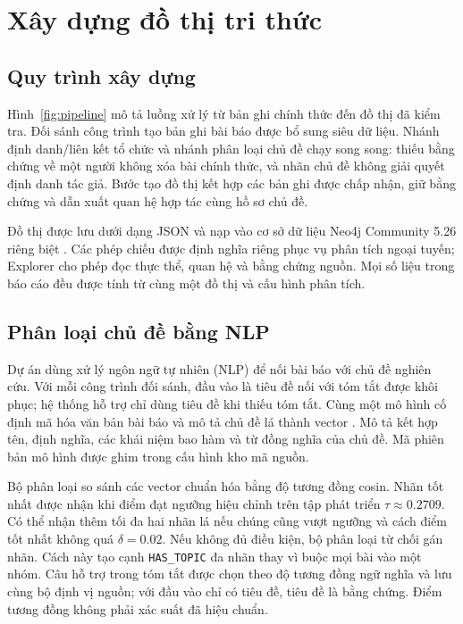 \chapter{Xây dựng đồ thị tri thức}
\label{ch:graph}
\section{Quy trình xây dựng}
Hình~\ref{fig:pipeline} mô tả luồng xử lý từ bản ghi chính thức đến đồ thị đã
kiểm tra. Đối sánh công trình tạo bản ghi bài báo được bổ sung siêu dữ liệu.
Nhánh định danh/liên kết tổ chức và nhánh phân loại chủ đề chạy song song:
thiếu bằng chứng về một người không xóa bài chính thức, và nhãn chủ đề không
giải quyết định danh tác giả. Bước tạo đồ thị kết hợp các bản ghi được chấp
nhận, giữ bằng chứng và dẫn xuất quan hệ hợp tác cùng hồ sơ chủ đề.



Đồ thị được lưu dưới dạng JSON và nạp vào cơ sở dữ liệu
Neo4j Community 5.26 riêng biệt \citep{neo4jDocs}. Các phép chiếu
được định nghĩa riêng phục vụ phân tích ngoại tuyến; Explorer cho phép đọc
thực thể, quan hệ và bằng chứng nguồn. Mọi số liệu trong báo cáo đều được tính
từ cùng một đồ thị và cấu hình phân tích.

\section{Phân loại chủ đề bằng NLP}
Dự án dùng xử lý ngôn ngữ tự nhiên (NLP) để nối bài báo với chủ đề nghiên cứu.
Với mỗi công trình đối sánh, đầu vào là tiêu đề nối với tóm tắt được khôi phục;
hệ thống hỗ trợ chỉ dùng tiêu đề khi thiếu tóm tắt. Cùng một mô hình cố định
 mã hóa văn bản bài báo và mô tả
chủ đề lá thành vector \citep{reimers2019sentencebert,minilmModelCard}. Mô tả
kết hợp tên, định nghĩa, các khái niệm bao hàm và từ đồng nghĩa của chủ đề.
Mã phiên bản mô hình được ghim trong cấu hình kho mã nguồn.

Bộ phân loại so sánh các vector chuẩn hóa bằng độ tương đồng cosin. Nhãn tốt
nhất được nhận khi điểm đạt ngưỡng hiệu chỉnh trên tập phát triển
$\tau\approx0.2709$. Có thể nhận thêm tối đa hai nhãn lá nếu chúng cũng vượt
ngưỡng và cách điểm tốt nhất không quá $\delta=0.02$. Nếu không đủ điều kiện,
bộ phân loại từ chối gán nhãn. Cách này tạo cạnh \texttt{HAS\_TOPIC} đa nhãn
thay vì buộc mọi bài vào một nhóm. Câu hỗ trợ trong tóm tắt được chọn theo độ
tương đồng ngữ nghĩa và lưu cùng bộ định vị nguồn; với đầu vào chỉ có tiêu đề,
tiêu đề là bằng chứng. Điểm tương đồng không phải xác suất đã hiệu chuẩn.

